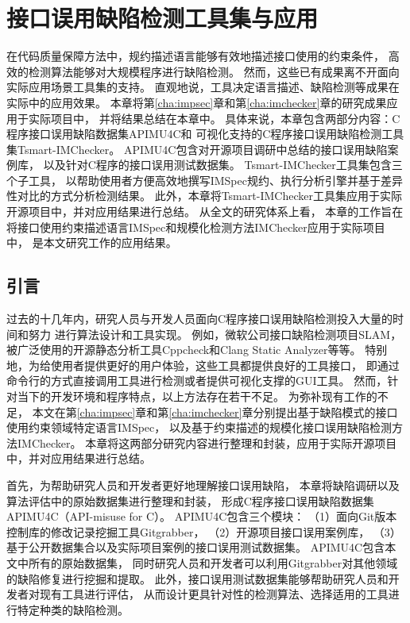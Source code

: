 \chapter{接口误用缺陷检测工具集与应用}
\label{cha:tools}
在代码质量保障方法中，规约描述语言能够有效地描述接口使用的约束条件，
高效的检测算法能够对大规模程序进行缺陷检测。
然而，这些已有成果离不开面向实际应用场景工具集的支持。
直观地说，工具决定语言描述、缺陷检测等成果在实际中的应用效果。
本章将第\ref{cha:impsec}章和第\ref{cha:imchecker}章的研究成果应用于实际项目中，
并将结果总结在本章中。
具体来说，本章包含两部分内容：C程序接口误用缺陷数据集APIMU4C和
可视化支持的C程序接口误用缺陷检测工具集Tsmart-IMChecker。
APIMU4C包含对开源项目调研中总结的接口误用缺陷案例库，
以及针对C程序的接口误用测试数据集。
Tsmart-IMChecker工具集包含三个子工具，
以帮助使用者方便高效地撰写IMSpec规约、执行分析引擎并基于差异性对比的方式分析检测结果。
此外，本章将Tsmart-IMChecker工具集应用于实际开源项目中，并对应用结果进行总结。
从全文的研究体系上看，
本章的工作旨在将接口使用约束描述语言IMSpec和规模化检测方法IMChecker应用于实际项目中，
是本文研究工作的应用结果。

\section{引言}
过去的十几年内，研究人员与开发人员面向C程序接口误用缺陷检测投入大量的时间和努力
进行算法设计和工具实现。
例如，微软公司接口缺陷检测项目SLAM，
被广泛使用的开源静态分析工具Cppcheck和Clang Static Analyzer等等。
特别地，为给使用者提供更好的用户体验，这些工具都提供良好的工具接口，
即通过命令行的方式直接调用工具进行检测或者提供可视化支撑的GUI工具。
然而，针对当下的开发环境和程序特点，以上方法存在若干不足。
为弥补现有工作的不足，
本文在第\ref{cha:impsec}章和第\ref{cha:imchecker}章分别提出基于缺陷模式的接口使用约束领域特定语言IMSpec，
以及基于约束描述的规模化接口误用缺陷检测方法IMChecker。
本章将这两部分研究内容进行整理和封装，应用于实际开源项目中，并对应用结果进行总结。

首先，为帮助研究人员和开发者更好地理解接口误用缺陷，
本章将缺陷调研以及算法评估中的原始数据集进行整理和封装，
形成C程序接口误用缺陷数据集APIMU4C（API-misuse for C）。
APIMU4C包含三个模块：
（1）面向Git版本控制库的修改记录挖掘工具Gitgrabber，
（2）开源项目接口误用案例库，
（3）基于公开数据集合以及实际项目案例的接口误用测试数据集。
APIMU4C包含本文中所有的原始数据集，
同时研究人员和开发者可以利用Gitgrabber对其他领域的缺陷修复进行挖掘和提取。
此外，接口误用测试数据集能够帮助研究人员和开发者对现有工具进行评估，
从而设计更具针对性的检测算法、选择适用的工具进行特定种类的缺陷检测。


